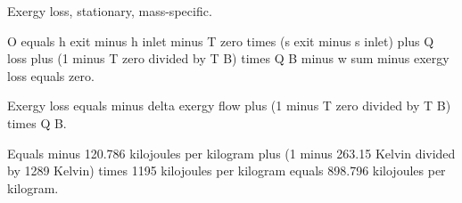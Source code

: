 Exergy loss, stationary, mass-specific.  

O equals h exit minus h inlet minus T zero times (s exit minus s inlet) plus Q loss plus (1 minus T zero divided by T B) times Q B minus w sum minus exergy loss equals zero.  

Exergy loss equals minus delta exergy flow plus (1 minus T zero divided by T B) times Q B.  

Equals minus 120.786 kilojoules per kilogram plus (1 minus 263.15 Kelvin divided by 1289 Kelvin) times 1195 kilojoules per kilogram equals 898.796 kilojoules per kilogram.